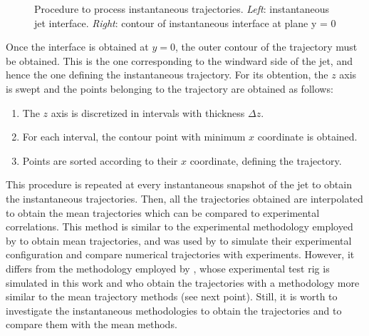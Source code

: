 \begin{figure}[ht]
     \centering
     \begin{subfigure}[b]{0.45\textwidth}
         \centering
     \end{subfigure}
     \begin{subfigure}[b]{0.45\textwidth}
         \centering
     \end{subfigure}
        \caption[Procedure to obtain instantaneous trajectories.]{Procedure to process instantaneous trajectories. \textsl{Left}: instantaneous jet interface. \textsl{Right}: contour of instantaneous interface at plane y = 0}
        \label{fig:trajectory_obtention_instantaneous_general}
\end{figure}

Once the interface is obtained at $y = 0$, the outer contour of the trajectory must be obtained. This is the one corresponding to the windward side of the jet, and hence the one defining the instantaneous trajectory. For its obtention, the $z$ axis is swept and the points belonging to the trajectory are obtained as follows:

\begin{enumerate}

	\item The $z$ axis is discretized in intervals with thickness $\Delta z$. 
	
	\item For each interval, the contour point with minimum $x$ coordinate is obtained.
	
	\item Points are sorted according to their $x$ coordinate, defining the trajectory.

\end{enumerate}

This procedure is repeated at every instantaneous snapshot of the jet to obtain the instantaneous trajectories. Then, all the trajectories obtained are interpolated to obtain the mean trajectories which can be compared to experimental correlations. This method is similar to the experimental methodology employed by  to obtain mean trajectories, and was used by  to simulate their experimental configuration and compare numerical trajectories with experiments. However, it differs from the methodology employed by , whose experimental test rig is simulated in this work and who obtain the trajectories with a methodology more similar to the mean trajectory methods (see next point). Still, it is worth to investigate the instantaneous methodologies to obtain the trajectories and to compare them with the mean methods.

